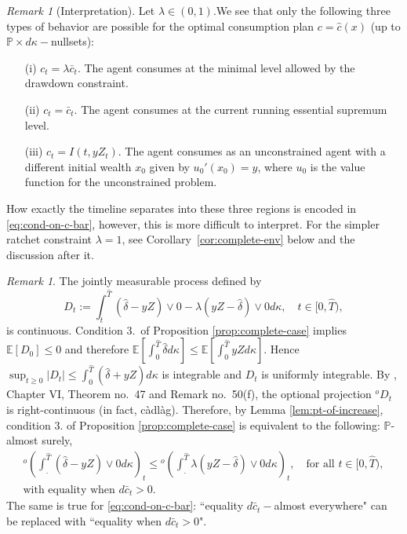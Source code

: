 \documentclass[11pt, oneside]{article}   	%
\theoremstyle{plain}
\theoremstyle{definition}
\theoremstyle{remark}
\newtheorem{rem}[thm]{Remark}
\begin{document}
\begin{rem}[Interpretation]
Let $\lambda\in(0,1)$.We see that only the following three types of behavior are possible for the optimal consumption plan $c=\hat{c}(x)$ (up to $\mathbb{P}\times d\kappa-$nullsets):
 \begin{enumerate}
\item[(i)] $c_t=\lambda\bar{c}_t$. The agent consumes at the minimal level allowed by the drawdown constraint.
\item[(ii)] $c_t=\bar{c}_t$. The agent consumes at the current running essential supremum level.
\item[(iii)] $c_t=I(t,yZ_t)$. The agent consumes as an unconstrained agent with a different initial wealth $x_0$ given by $u_0'(x_0)=y$, where $u_0$ is the value function for the unconstrained problem.
\end{enumerate}
How exactly the timeline separates into these three regions is encoded in \eqref{eq:cond-on-c-bar}, however, this is more difficult to interpret. For the simpler ratchet constraint $\lambda=1$, see Corollary~\ref{cor:complete-env} below and the discussion after it.
\end{rem}

\begin{rem}\label{rem:pts-of-increase}
The jointly measurable process defined by 
$$D_t:=\int_t^{\hat{T}} \left(\hat\delta-yZ\right)\vee0 -\lambda\left(yZ-\hat\delta\right)\vee 0d\kappa,\quad t\in[0,\hat{T}),$$
is continuous. Condition 3.~of Proposition \ref{prop:complete-case} implies $\mathbb{E}[D_0]\leq 0$ and therefore $\mathbb{E}\left[\int_0^{\hat{T}}\hat\delta d\kappa\right]\leq\mathbb{E}\left[\int_0^{\hat{T}} yZ d\kappa\right]$. Hence  $\sup_{t\geq 0} \vert D_t\vert\leq \int_0^{\hat{T}} (\hat\delta+yZ) d\kappa$ is integrable and $D_t$ is uniformly integrable. By \cite{dellacherie-meyerB}, Chapter VI, Theorem no.~47 and Remark no.~50(f), the optional projection ${}^oD_t$ is right-continuous (in fact, c\`adl\`ag). Therefore, by Lemma \ref{lem:pt-of-increase}, condition 3. of Proposition \ref{prop:complete-case} is equivalent to the following: $\mathbb{P}$-almost surely,
\begin{equation*}
\begin{aligned}
^o\left(\int_.^{\hat{T}} (\hat\delta-yZ)\vee0 d\kappa\right)_t\leq{}^o\left(\int_.^{\hat{T}} \lambda(yZ-\hat\delta)\vee 0 d\kappa\right)_t,\quad\text{for all }t\in[0,{\hat{T}}),\\
\text{with equality when } d\bar{c}_t>0.
\end{aligned}
\end{equation*}
The same is true for \eqref{eq:cond-on-c-bar}: ``equality $d\bar{c}_t-$almost everywhere" can be replaced with ``equality when $d\bar{c}_t>0$".
\end{rem}
\end{document}
